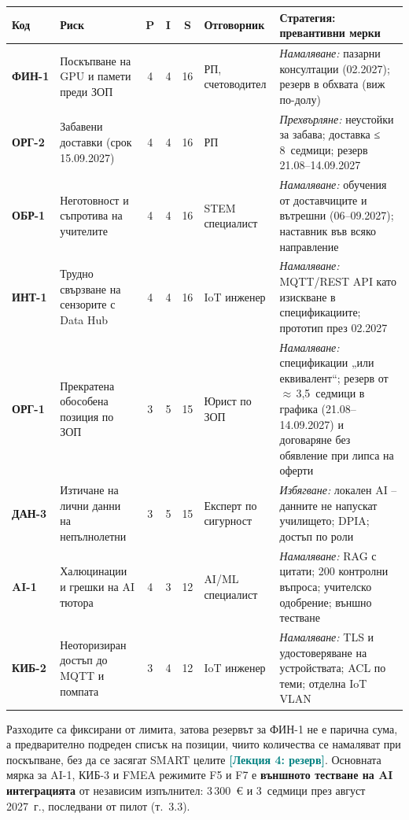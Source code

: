 \documentclass[11pt,a4paper]{article}
\renewcommand{\arraystretch}{1.15}
\newcommand{\lecturetag}[1]{\textcolor{teal}{\small\bfseries[#1]}}
\begin{document}
\begingroup\footnotesize
\setlength{\tabcolsep}{3.5pt}
\renewcommand{\arraystretch}{1.1}
\setlength{\LTpre}{3pt}\setlength{\LTpost}{3pt}
\begin{xltabular}{\textwidth}{@{}>{\bfseries}l>{\raggedright\arraybackslash}p{3.7cm}ccc>{\raggedright\arraybackslash}p{1.8cm}>{\raggedright\arraybackslash}X@{}}
\toprule
{}Код & \textbf{Риск} & \textbf{P} & \textbf{I} & \textbf{S} & \textbf{Отговорник} & \textbf{Стратегия: превантивни мерки}\\
\midrule
\endhead
ФИН-1 & Поскъпване на GPU и памети преди ЗОП & 4 & 4 & 16 & РП, счетоводител & \textit{Намаляване:} пазарни консултации (02.2027); резерв в обхвата (виж по-долу)\\
ОРГ-2 & Забавени доставки (срок 15.09.2027) & 4 & 4 & 16 & РП & \textit{Прехвърляне:} неустойки за забава; доставка ≤\,8~седмици; резерв 21.08–14.09.2027\\
ОБР-1 & Неготовност и съпротива на учителите & 4 & 4 & 16 & STEM специалист & \textit{Намаляване:} обучения от доставчиците и вътрешни (06–09.2027); наставник във всяко направление\\
ИНТ-1 & Трудно свързване на сензорите с Data Hub & 4 & 4 & 16 & IoT инженер & \textit{Намаляване:} MQTT/REST API като изискване в спецификациите; прототип през 02.2027\\
ОРГ-1 & Прекратена обособена позиция по ЗОП & 3 & 5 & 15 & Юрист по ЗОП & \textit{Намаляване:} спецификации „или еквивалент“; резерв от $\approx$\,3,5~седмици в графика (21.08–14.09.2027) и договаряне без обявление при липса на оферти\\
ДАН-3 & Изтичане на лични данни на непълнолетни & 3 & 5 & 15 & Експерт по сигурност & \textit{Избягване:} локален AI – данните не напускат училището; DPIA; достъп по роли\\
AI-1 & Халюцинации и грешки на AI тютора & 4 & 3 & 12 & AI/ML специалист & \textit{Намаляване:} RAG с цитати; 200 контролни въпроса; учителско одобрение; външно тестване\\
КИБ-2 & Неоторизиран достъп до MQTT и помпата & 3 & 4 & 12 & IoT инженер & \textit{Намаляване:} TLS и удостоверяване на устройствата; ACL по теми; отделна IoT VLAN\\
\bottomrule
\end{xltabular}
\endgroup

Разходите са фиксирани от лимита, затова резервът за ФИН-1 не е парична сума, а предварително подреден списък на позиции, чиито количества се намаляват при поскъпване, без да се засягат SMART целите \lecturetag{Лекция 4: резерв}. Основната мярка за AI-1, КИБ-3 и FMEA режимите F5 и F7 е \textbf{външното тестване на AI интеграцията} от независим изпълнител: 3\,300~€ и 3~седмици през август 2027~г., последвани от пилот (т.~3.3).
\end{document}
